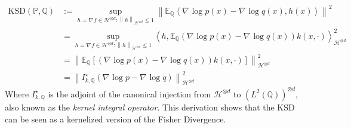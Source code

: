 \documentclass{uai2023} %
\begin{document}
\begin{equation*} \label{eq:KSD}
\begin{aligned}
    \text{KSD}(\mathbb{ P }, \mathbb{ Q }) &:= \sup_{ h = \nabla_{  } f  \in \mathcal  H^{\otimes d}: \left \|h \right \|_{\mathcal H^{\otimes d}} \leq 1 } \left \| \mathbb{E}_{  \mathbb{ Q } } \left \langle \nabla_{  }   \log p(x) - \nabla_{  }   \log q(x), h(x)\right \rangle \right \|^2\\
					     &=  \sup_{ h = \nabla_{  } f  \in \mathcal  H^{\otimes d}: \left \|h \right \|_{\mathcal H^{\otimes d}} \leq 1 } \left \langle h, \mathbb{E}_{ \mathbb{ Q } } (\nabla_{  }  \log p(x) - \nabla_{  }  \log q(x)  )k(x, \cdot)\right \rangle_{\mathcal H^{\otimes d}}^2  \\
					     &=  \left \| \mathbb{E}_{ \mathbb{ Q } } \left \lbrack  (\nabla_{  }  \log p(x) - \nabla_{  }  \log q(x)  ) k(x, \cdot) \right \rbrack  \right \|_{\mathcal  H^{\otimes d}}^2 \\
					     &= \left \| I^\star_{k, \mathbb{ Q }} (\nabla_{  }  \log p - \nabla_{  }  \log q  ) \right \|_{\mathcal  H^{\otimes d}}^2
\end{aligned}
\end{equation*}
Where $ I^\star_{k, \mathbb{ Q }} $ is the adjoint of the canonical injection from $ \mathcal  H^{\otimes d} $ to $ (L^2(\mathbb{ Q }))^{\otimes d} $, also known as the \emph{kernel integral operator}.
This derivation shows that the KSD can be seen as a kernelized version of the 
Fisher Divergence.
\end{document}
